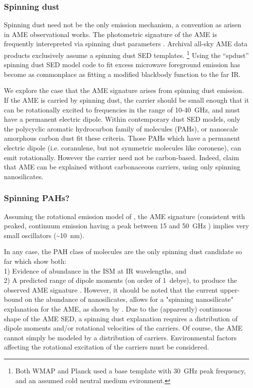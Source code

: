     \subsubsection{Spinning dust}
     Spinning dust need not be the only emission mechanism, a convention as arisen in AME observational works. The photometric signature of the AME is frequently interepreted via spinning dust parameters \citep{ysard11,ali-haimoud10}. Archival all-sky AME data products exclusively assume a spinning dust SED templates.   \footnote{Both WMAP and Planck used a base template with 30~GHz peak frequency, and an assumed cold neutral medium evironment.} Using the ``spdust'' spinning dust SED model code to fit excess microwave foreground emission has become as commonplace as fitting a modified blackbody function to the far IR.

      We explore the case that the AME signature arises from spinning dust emission. If the AME is carried by spinning dust, the carrier should be small enough that it can be rotationally excited to frequencies in the range of 10-40~GHz, and must have a permanent electric dipole. Within contemporary dust SED models, only the polycyclic aromatic hydrocarbon family of molecules (PAHs), or nanoscale amorphous carbon dust fit these criteria. Those PAHs which have a permanent electric dipole (i.e. coranulene, but not symmetric molecules like coronene), can emit rotationally. However the carrier need not be carbon-based. Indeed, \cite{hensley17a} claim that AME can be explained without carbonaceous carriers, using only spinning nanosilicates.

     \subsubsection{Spinning PAHs?}
       Assuming the rotational emission model of \cite{draine98b}, the AME signature (consistent with peaked, continuum emission having a peak between 15 and 50~GHz ) implies very small oscillators (\textasciitilde{}10~nm).

       In any case, the PAH class of molecules are the only spinning dust candidate so far which show both: \\
       1) Evidence of abundance in the ISM at IR wavelengths, and \\
       2) A predicted range of dipole moments (on order of 1~debye), to produce the observed AME signature \citep{draine98b, lovas05, thorwirth07}. However, it should be noted that the current upper-bound on the abundance of nanosilicates, allows for a "spinning nanosilicate" explanation for the AME, as shown by \cite{hensley17a}. Due to the (apparently) continuous shape of the AME SED, a spinning dust explanation requires a distribution of dipole moments and/or rotational velocities of the carriers. Of course, the AME cannot simply be modeled by a distribution of carriers. Environmental factors affecting the rotational excitation of the carriers must be considered.


